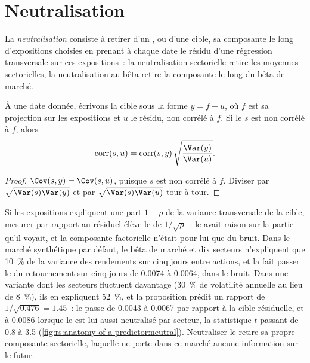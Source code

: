 \section{Neutralisation}

\begin{definition}[Neutralisation]\label{def:rs:anatomy-of-a-predictor:neutralise}
La \emph{neutralisation} consiste à retirer d'un , ou d'une cible, sa composante le long d'expositions choisies
en prenant à chaque date le résidu d'une régression transversale sur ces expositions~: la neutralisation sectorielle retire
les moyennes sectorielles, la neutralisation au bêta retire la composante le long du bêta de marché.
\end{definition}

\begin{proposition}\label{prop:rs:anatomy-of-a-predictor:neutral}
À une date donnée, écrivons la cible sous la forme $y = f + u$, où $f$ est sa projection sur les expositions et $u$ le résidu, non corrélé
à $f$. Si le  $s$ est non corrélé à $f$, alors
\[
\operatorname{corr}(s, u) = \operatorname{corr}(s, y)\,\sqrt{\frac{\Var(y)}{\Var(u)}}.
\]
\end{proposition}

\begin{proof}
$\Cov(s, y) = \Cov(s, u)$, puisque $s$ est non corrélé à $f$. Diviser par $\sqrt{\Var(s)\Var(y)}$ et par $\sqrt{\Var(s)\Var(u)}$
tour à tour.
\end{proof}

Si les expositions expliquent une part $1 - \rho$ de la variance transversale de la cible, mesurer par rapport au résiduel élève le
 de $1/\sqrt\rho$~: le  avait raison sur la partie qu'il voyait, et la composante factorielle n'était pour lui que du bruit. Dans le
marché synthétique par défaut, le bêta de marché et dix secteurs n'expliquent que 10~\% de la variance des rendements sur cinq jours entre actions, et
la  fait passer le  du retournement sur cinq jours de 0.0074 à 0.0064, dans le bruit. Dans une variante dont les secteurs fluctuent davantage
(30~\% de volatilité annuelle au lieu de 8~\%), ils en expliquent 52~\%, et la proposition prédit un rapport de $1/\sqrt{0.476} = 1.45$~: le 
passe de 0.0043 à 0.0067 par rapport à la cible résiduelle, et à 0.0086 lorsque le  est lui aussi neutralisé par secteur, la
statistique $t$ passant de 0.8 à 3.5 (\cref{fig:rs:anatomy-of-a-predictor:neutral}). Neutraliser le  retire sa propre
composante sectorielle, laquelle ne porte dans ce marché aucune information sur le futur.

